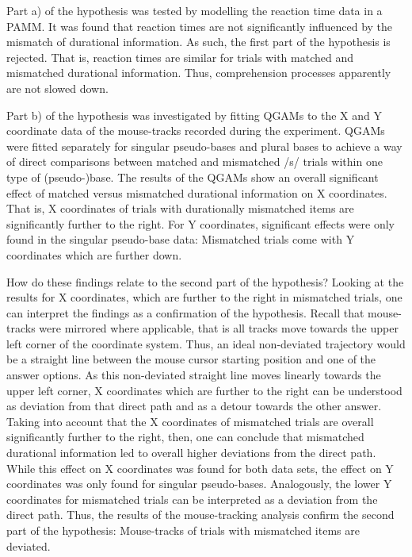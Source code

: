 Part a) of the hypothesis was tested by modelling the reaction time data in a PAMM. It was found that reaction times are not significantly influenced by the mismatch of durational information. As such, the first part of the hypothesis is rejected. That is, reaction times are similar for trials with matched and mismatched durational information. Thus, comprehension processes apparently are not slowed down.

Part b) of the hypothesis was investigated by fitting QGAMs to the X and Y coordinate data of the mouse-tracks recorded during the experiment. QGAMs were fitted separately for singular pseudo-bases and plural bases to achieve a way of direct comparisons between matched and mismatched /s/ trials within one type of (pseudo-)base. The results of the QGAMs show an overall significant effect of matched versus mismatched durational information on X coordinates. That is, X coordinates of trials with durationally mismatched items are significantly further to the right. For Y coordinates, significant effects were only found in the singular pseudo-base data: Mismatched trials come with Y coordinates which are further down. 

How do these findings relate to the second part of the hypothesis? Looking at the results for X coordinates, which are further to the right in mismatched trials, one can interpret the findings as a confirmation of the hypothesis. Recall that mouse-tracks were mirrored where applicable, that is all tracks move towards the upper left corner of the coordinate system. Thus, an ideal non-deviated trajectory would be a straight line between the mouse cursor starting position and one of the answer options. As this non-deviated straight line moves linearly towards the upper left corner, X coordinates which are further to the right can be understood as deviation from that direct path and as a detour towards the other answer. Taking into account that the X coordinates of mismatched trials are overall significantly further to the right, then, one can conclude that mismatched durational information led to overall higher deviations from the direct path. While this effect on X coordinates was found for both data sets, the effect on Y coordinates was only found for singular pseudo-bases. Analogously, the lower Y coordinates for mismatched trials can be interpreted as a deviation from the direct path. Thus, the results of the mouse-tracking analysis confirm the second part of the hypothesis: Mouse-tracks of trials with mismatched items are deviated.

